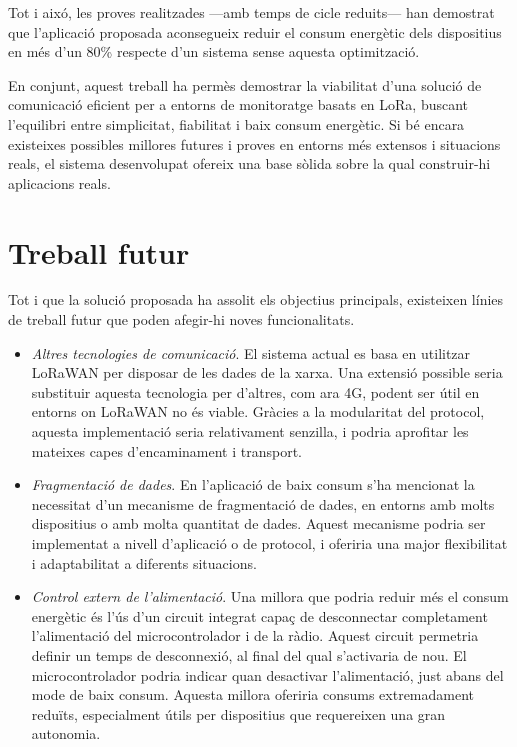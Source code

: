 \documentclass{tfgitic}[2024/07/01]
\begin{document}
{Tot i aixó, les proves realitzades ---amb temps de cicle reduits--- han demostrat que l'aplicació proposada aconsegueix reduir el consum energètic dels dispositius en més d'un 80\% respecte d'un sistema sense aquesta optimització.

En conjunt, aquest treball ha permès demostrar la viabilitat d'una solució de comunicació eficient per a entorns de monitoratge basats en LoRa, buscant l'equilibri entre simplicitat, fiabilitat i baix consum energètic. Si bé encara existeixes possibles millores futures i proves en entorns més extensos i situacions reals, el sistema desenvolupat ofereix una base sòlida sobre la qual construir-hi aplicacions reals.

\chapter{Treball futur}
Tot i que la solució proposada ha assolit els objectius principals, existeixen línies de treball futur que poden afegir-hi noves funcionalitats.

\begin{itemize}
    \item \emph{Altres tecnologies de comunicació}. El sistema actual es basa en utilitzar LoRaWAN per disposar de les dades de la xarxa. Una extensió possible seria substituir aquesta tecnologia per d'altres, com ara 4G, podent ser útil en entorns on LoRaWAN no és viable. Gràcies a la modularitat del protocol, aquesta implementació seria relativament senzilla, i podria aprofitar les mateixes capes d'encaminament i transport.
    \item \emph{Fragmentació de dades}. En l'aplicació de baix consum s'ha mencionat la necessitat d'un mecanisme de fragmentació de dades, en entorns amb molts dispositius o amb molta quantitat de dades. Aquest mecanisme podria ser implementat a nivell d'aplicació o de protocol, i oferiria una major flexibilitat i adaptabilitat a diferents situacions.
    \item \emph{Control extern de l'alimentació}. Una millora que podria reduir més el consum energètic és l'ús d'un circuit integrat capaç de desconnectar completament l'alimentació del microcontrolador i de la ràdio. Aquest circuit permetria definir un temps de desconnexió, al final del qual s'activaria de nou. El microcontrolador podria indicar quan desactivar l'alimentació, just abans del mode de baix consum. Aquesta millora oferiria consums extremadament reduïts, especialment útils per dispositius que requereixen una gran autonomia.  
\end{itemize}

}
\end{document}
